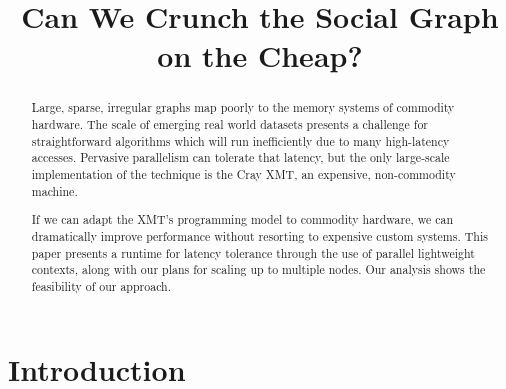 \documentclass[10pt,nocopyrightspace,preprint]{sigplanconf}
\begin{document}
\title{Can We Crunch the Social Graph on the Cheap?}




\maketitle
\begin{abstract}
  Large, sparse, irregular graphs map poorly to the memory systems of
  commodity hardware. The scale of emerging real world datasets
  presents a challenge for straightforward algorithms which will run
  inefficiently due to many high-latency accesses.  Pervasive
  parallelism can tolerate that latency, but the only large-scale
  implementation of the technique is the Cray XMT, an expensive,
  non-commodity machine.

  If we can adapt the XMT's programming model to commodity hardware,
  we can dramatically improve performance without resorting to
  expensive custom systems. This paper presents a runtime for latency
  tolerance through the use of parallel lightweight contexts, along
  with our plans for scaling up to multiple nodes. Our analysis shows
  the feasibility of our approach.
\end{abstract}

\section{Introduction}
\end{document}
